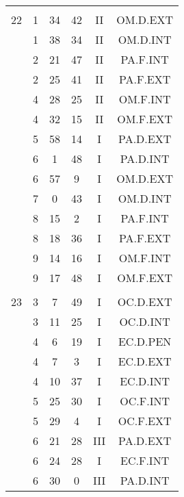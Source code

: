 \documentclass[12pt, a4paper]{article}
\begin{document}
\begin{multicols}{3}
{\begin{tabular}{c c c c c c}
	 	 	 	 & & & & & \\%
	 	 	 	22 & 1 & 34 & 42 & II & OM.D.EXT\\%
	 	 	 	 & 1 & 38 & 34 & II & OM.D.INT\\%
	 	 	 	 & 2 & 21 & 47 & II & PA.F.INT\\%
	 	 	 	 & 2 & 25 & 41 & II & PA.F.EXT\\%
	 	 	 	 & 4 & 28 & 25 & II & OM.F.INT\\%
	 	 	 	 & 4 & 32 & 15 & II & OM.F.EXT\\%
	 	 	 	 & 5 & 58 & 14 & I & PA.D.EXT\\%
	 	 	 	 & 6 & 1 & 48 & I & PA.D.INT\\%
	 	 	 	 & 6 & 57 & 9 & I & OM.D.EXT\\%
	 	 	 	 & 7 & 0 & 43 & I & OM.D.INT\\%
	 	 	 	 & 8 & 15 & 2 & I & PA.F.INT\\%
	 	 	 	 & 8 & 18 & 36 & I & PA.F.EXT\\%
	 	 	 	 & 9 & 14 & 16 & I & OM.F.INT\\%
	 	 	 	 & 9 & 17 & 48 & I & OM.F.EXT\\%
	 	 	 	 & & & & & \\%
	 	 	 	23 & 3 & 7 & 49 & I & OC.D.EXT\\%
	 	 	 	 & 3 & 11 & 25 & I & OC.D.INT\\%
	 	 	 	 & 4 & 6 & 19 & I & EC.D.PEN\\%
	 	 	 	 & 4 & 7 & 3 & I & EC.D.EXT\\%
	 	 	 	 & 4 & 10 & 37 & I & EC.D.INT\\%
	 	 	 	 & 5 & 25 & 30 & I & OC.F.INT\\%
	 	 	 	 & 5 & 29 & 4 & I & OC.F.EXT\\%
	 	 	 	 & 6 & 21 & 28 & III & PA.D.EXT\\%
	 	 	 	 & 6 & 24 & 28 & I & EC.F.INT\\%
	 	 	 	 & 6 & 30 & 0 & III & PA.D.INT\\%
	 	 \end{tabular}
 	}
\end{multicols}
\end{document}
